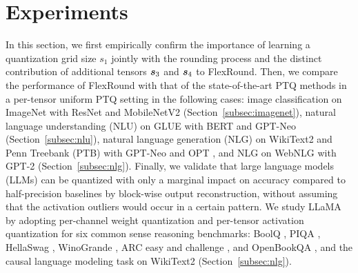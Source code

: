 \documentclass{article}
\theoremstyle{plain}
\theoremstyle{definition}
\theoremstyle{remark}
\begin{document}
\section{Experiments}\label{sec:experiments}
In this section, %
we first empirically confirm the importance of learning a quantization grid size $s_1$ jointly with the rounding process and the distinct contribution of additional tensors ${\bm{s}}_3$ and ${\bm{s}}_4$ to FlexRound. %
Then, we compare the performance of FlexRound with that of the state-of-the-art PTQ methods in a per-tensor uniform PTQ setting in the following cases: image classification on ImageNet \citep{russakovsky2015imagenet} with ResNet \citep{he2016deep} and MobileNetV2 \citep{sandler2018mobilenetv2} (Section~\ref{subsec:imagenet}), natural language understanding (NLU) on GLUE \citep{wang2018glue} with BERT \citep{devlin2018bert} and GPT-Neo \citep{gpt-neo} (Section~\ref{subsec:nlu}), natural language generation (NLG) on WikiText2 \citep{merity2016pointer} and Penn Treebank (PTB) \citep{marcus-etal-1993-building} with GPT-Neo and OPT \citep{zhang2022opt}, and NLG on WebNLG \citep{gardent2017webnlg} with GPT-2 \citep{radford2019gpt2} (Section~\ref{subsec:nlg}). 
Finally, we validate that large language models (LLMs) can be quantized with only a marginal impact on accuracy compared to half-precision baselines by block-wise output reconstruction, without assuming that the activation outliers would occur in a certain pattern. We study LLaMA \citep{touvron2023llama} by adopting per-channel weight quantization and per-tensor activation quantization for six common sense reasoning benchmarks: BoolQ \citep{clark2019boolq}, PIQA \citep{bisk2020piqa}, HellaSwag \citep{zellers2019hellaswag}, WinoGrande \citep{sakaguchi2021winogrande}, ARC easy and challenge \citep{clark2018arc}, and OpenBookQA \citep{mihaylov2018obqa}, and the causal language modeling task on WikiText2 (Section~\ref{subsec:nlg}).
\end{document}

